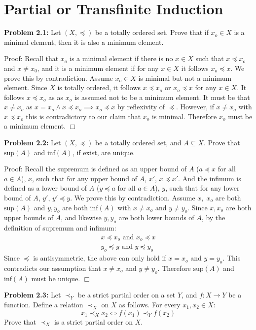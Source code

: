 \documentclass[11pt]{article}
\begin{document}
\section{Partial or Transfinite Induction}

\textbf{Problem 2.1:} Let $(X, \preceq)$ be a totally ordered set. Prove that if $x_o \in X$ is a minimal element, then it is also a minimum element.

Proof: Recall that $x_o$ is a minimal element if there is no $x \in X$ such that $x \preceq x_o$ and $x \neq x_0$, and it is a minimum element if for any $x \in X$ it follows $x_o \preceq x$. We prove this by contradiction. Assume $x_o \in X$ is minimal but not a minimum element. Since $X$ is totally ordered, it follows $x \preceq x_o$ or $x_o \preceq x$ for any $x \in X$. It follows $x \preceq x_o$ as as $x_o$ is assumed not to be a minimum element. It must be that $x \neq x_o$ as $x = x_o \land x \preceq x_o \implies x_o \preceq x$ by reflexivity of $\preceq$. However, if $x \neq x_o$ with $x \preceq x_o$ this is contradictory to our claim that $x_o$ is minimal. Therefore $x_o$ must be a minimum element. $\Box$

\newpage

\textbf{Problem 2.2:} Let $(X, \preceq)$ be a totally ordered set, and $A \subseteq X$. Prove that $\text{sup}(A)$ and $\text{inf}(A)$, if exist, are unique.

Proof: Recall the supremum is defined as an upper bound of $A$ ($a \preceq x$ for all $a \in A$), $x$, such that for any upper bound of $A$, $x'$, $x \preceq x'$. And the infimum is defined as a lower bound of $A$ ($y \preceq a$ for all $a \in A$), $y$, such that for any lower bound of $A$, $y'$, $y' \preceq y$. We prove this by contradiction. Assume $x, \; x_o$ are both $\text{sup}(A)$ and $y, y_o$ are both $\text{inf}(A)$ with $x \neq x_o$ and $y \neq y_o$. Since $x, x_o$ are both upper bounds of $A$, and likewise $y, y_o$ are both lower bounds of $A$, by the definition of supremum and infimum:
\begin{gather*}
    x \preceq x_o \text{ and } x_o \preceq x \\
    y_o \preceq y \text{ and } y \preceq y_o 
\end{gather*}
Since $\preceq$ is antisymmetric, the above can only hold if $x = x_o$ and $y = y_o$. This contradicts our assumption that $x \neq x_o$ and $y \neq y_o$. Therefore $\text{sup}(A)$ and $\text{inf}(A)$ must be unique. $\Box$

\textbf{Problem 2.3:} Let $\prec_Y$ be a strict partial order on a set $Y$, and $f : X \rightarrow Y$ be a function. Define a relation $\prec_X$ on $X$ as follows. For every $x_1, x_2 \in X$:
\begin{equation*}
    x_1 \prec_X x_2 \iff f(x_1) \prec_Y f(x_2)
\end{equation*}
Prove that $\prec_X$ is a strict partial order on $X$.
\end{document}
